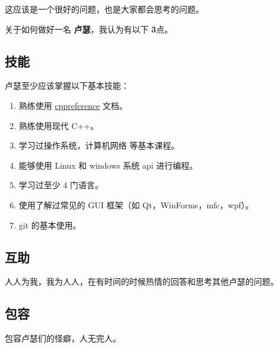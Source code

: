 这应该是一个很好的问题，也是大家都会思考的问题。

关于如何做好一名 \textbf{卢瑟}，我认为有以下 \textbf{3}点。

\subsection{技能}

卢瑟至少应该掌握以下基本技能：

\begin{enumerate}

    \item 熟练使用 \href{https://zh.cppreference.com/w/cpp}{cppreference} 文档。
    \item 熟练使用现代 C++。
    \item 学习过操作系统，计算机网络 等基本课程。
    \item 能够使用 Linux 和 windows 系统 api 进行编程。
    \item 学习过至少 4 门语言。
    \item 使用了解过常见的 GUI 框架（如 Qt，WinForms，mfc，wpf）。
    \item git 的基本使用。
\end{enumerate}

\subsection{互助}

人人为我，我为人人，在有时间的时候热情的回答和思考其他卢瑟的问题。

\subsection{包容}

包容卢瑟们的怪癖，人无完人。

